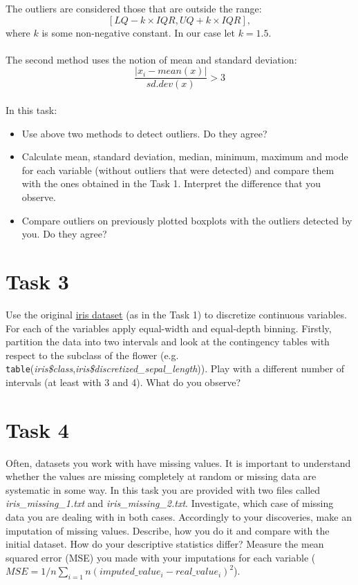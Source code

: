 \documentclass{article}
\begin{document}
The outliers are considered those that are outside the range:
$$[LQ - k\times IQR, UQ + k \times IQR],$$
where $k$ is some non-negative constant. In our case let $k = 1.5$.\\
\\
The second method uses the notion of mean and standard deviation:
$$\frac{|x_i-mean(x)|}{sd.dev(x)} > 3$$\\
In this task:
\begin{itemize}
\item Use above two methods to detect outliers. Do they agree?
\item Calculate  mean, standard deviation, median, minimum, maximum and mode for each variable (without outliers that were detected) and compare them with the ones obtained in the Task 1. Interpret the difference that you observe.
\item Compare outliers on previously plotted boxplots with the outliers detected by you. Do they agree?
\end{itemize}

\section*{Task 3}
Use the original \href{http://www0.cs.ucl.ac.uk/staff/m.herbster/GI07/week4/iris.data.txt}{iris dataset} (as in the Task 1) to discretize continuous variables. For each of the variables apply equal-width and equal-depth binning. Firstly, partition the data into two intervals and look at the contingency tables with respect to the subclass of the flower (e.g.  \texttt{table}(\emph{iris\$class},\emph{iris\$discretized\_sepal\_length})). Play with a different number of intervals (at least with 3 and 4). What do you observe?

\section*{Task 4}
Often, datasets you work with have missing values. It is important to understand whether the values are missing completely at random or missing data are systematic in some way. In this task you are provided with two files called \emph{iris\_missing\_1.txt} and \emph{iris\_missing\_2.txt}. Investigate, which case of missing data you are dealing with in both cases. Accordingly to your discoveries, make an imputation of missing values. Describe, how you do it and compare with the initial dataset. How do your descriptive statistics differ? Measure the mean squared error (MSE) you made with your imputations for each variable ($MSE = 1/n \sum_{i=1}{n}(imputed\_value_{i} - real\_value_{i})^2$).
\end{document}
